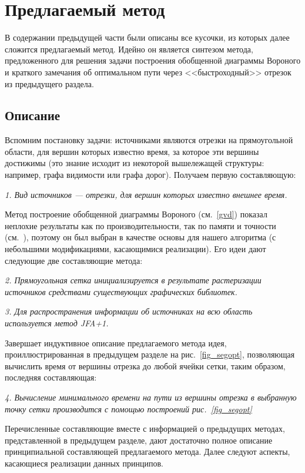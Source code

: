 \documentclass[12pt]{article}
\begin{document}
\section{Предлагаемый метод}
В содержании предыдущей части были описаны все кусочки, из которых 
далее сложится предлагаемый метод. Идейно он является синтезом метода, 
предложенного для решения задачи построения обобщенной диаграммы Вороного 
и краткого замечания об оптимальном пути через <<быстроходный>>
отрезок из предыдущего раздела.

\subsection{Описание}
Вспомним постановку задачи: источниками являются отрезки на 
прямоугольной области, для вершин которых известно время, за которое эти вершины
достижимы (это знание исходит из некоторой вышележащей структуры: например, 
графа видимости или графа дорог). Получаем первую составляющую:

\emph{1. Вид источников --- отрезки, для вершин которых известно внешнее время.}

Метод построение обобщенной диаграммы Вороного (см.~\ref{gvd}) показал неплохие
результаты как по производительности, так по памяти и точности (см.~\cite{gvd}), 
поэтому он был выбран в качестве основы для нашего алгоритма 
(с небольшими модификациями, касающимися реализации). Его идеи дают
следующие две составляющие метода:

\emph{2. Прямоугольная сетка инициализируется в результате растеризации
источников средствами существующих графических библиотек.}

\emph{3. Для распространения информации об источниках на всю
область используется метод \emph{JFA+1}.}

Завершает индуктивное описание предлагаемого метода
идея, проиллюстрированная в предыдущем разделе на рис.~\ref{fig_segopt}, позволяющая
вычислить время от вершины отрезка до любой ячейки сетки, таким образом, 
последняя составляющая:

\emph{4. Вычисление минимального времени на пути из вершины отрезка
в выбранную точку сетки производится с помощью построений рис.~\ref{fig_segopt}}

Перечисленные составляющие вместе с информацией о предыдущих
методах, представленной в предыдущем разделе, дают достаточно полное 
описание принципиальной составляющей предлагаемого метода. 
Далее следуют аспекты, касающиеся реализации данных принципов.
\end{document}
